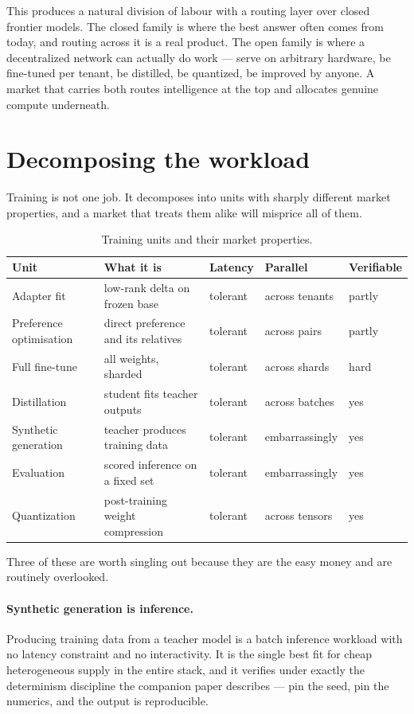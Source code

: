 \documentclass[11pt,a4paper]{article}
\begin{document}
This produces a natural division of labour with a routing layer over closed
frontier models. The closed family is where the best answer often comes from
today, and routing across it is a real product. The open family is where a
decentralized network can actually do work --- serve on arbitrary hardware, be
fine-tuned per tenant, be distilled, be quantized, be improved by anyone. A market
that carries both routes intelligence at the top and allocates genuine compute
underneath.

\section{Decomposing the workload}

Training is not one job. It decomposes into units with sharply different market
properties, and a market that treats them alike will misprice all of them.

\begin{table}[h]
\centering
\begin{tabularx}{\textwidth}{lXlll}
\toprule
Unit & What it is & Latency & Parallel & Verifiable \\
\midrule
Adapter fit & low-rank delta on frozen base & tolerant & across tenants & partly \\
Preference optimisation & direct preference and its relatives & tolerant & across pairs & partly \\
Full fine-tune & all weights, sharded & tolerant & across shards & hard \\
Distillation & student fits teacher outputs & tolerant & across batches & yes \\
Synthetic generation & teacher produces training data & tolerant & embarrassingly & yes \\
Evaluation & scored inference on a fixed set & tolerant & embarrassingly & yes \\
Quantization & post-training weight compression & tolerant & across tensors & yes \\
\bottomrule

\end{tabularx}
\caption{Training units and their market properties.}
\end{table}

Three of these are worth singling out because they are the easy money and are
routinely overlooked.

\paragraph{Synthetic generation is inference.} Producing training data from a
teacher model is a batch inference workload with no latency constraint and no
interactivity. It is the single best fit for cheap heterogeneous supply in the
entire stack, and it verifies under exactly the determinism discipline the
companion paper describes --- pin the seed, pin the numerics, and the output is
reproducible.
\end{document}
